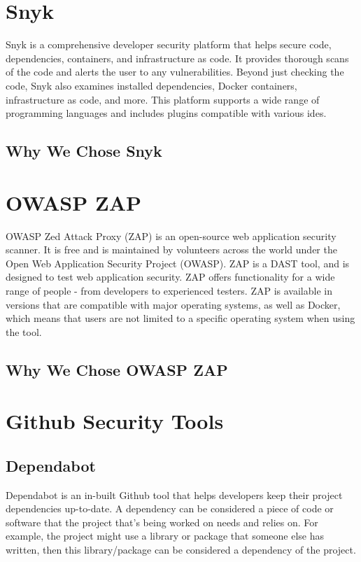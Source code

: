\section{Snyk}
Snyk is a comprehensive developer security platform that helps secure code, dependencies, containers, and infrastructure as code. It provides thorough scans of the code and alerts the user to any vulnerabilities. Beyond just checking the code, Snyk also examines installed dependencies, Docker containers, infrastructure as code, and more. This platform supports a wide range of programming languages and includes plugins compatible with various \acrlong{ide}s.\cite{snyk}
\subsection{Why We Chose Snyk}

\section{OWASP ZAP}
OWASP Zed Attack Proxy (ZAP) is an open-source web application security scanner. It is free and is maintained by volunteers across the world under the Open Web Application Security Project (OWASP). ZAP is a DAST tool, and is designed to test web application security. ZAP offers functionality for a wide range of people - from developers to experienced testers. ZAP is available in versions that are compatible with major operating systems, as well as Docker, which means that users are not limited to a specific operating system when using the tool.\cite{owaspZAP}


\subsection{Why We Chose OWASP ZAP}


\section{Github Security Tools}

\subsection{Dependabot}
Dependabot is an in-built Github tool that helps developers keep their project dependencies up-to-date. A dependency can be considered a piece of code or software that the project that's being worked on needs and relies on. For example, the project might use a library or package that someone else has written, then this library/package can be considered a dependency of the project. 

